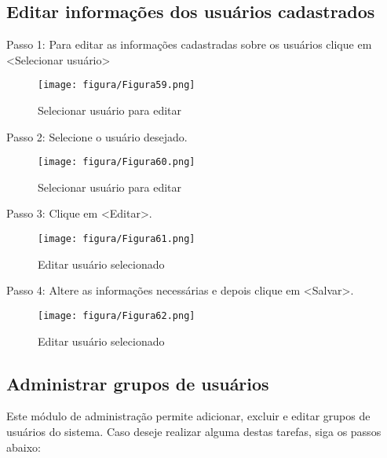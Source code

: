 \documentclass[12pt,hidelinks]{article}
\begin{document}
    \subsection{Editar informações dos usuários cadastrados}
    
    Passo 1: Para editar as informações cadastradas sobre os usuários clique em <Selecionar usuário>
    
    \begin{figure}[!htp]
                \centering
                \texttt{[image: figura/Figura59.png]}
                \caption{Selecionar usuário para editar}
            \label{Rotulo}
        \end{figure}

    Passo 2: Selecione o usuário desejado.
    
    \begin{figure}[!htp]
                \centering
                \texttt{[image: figura/Figura60.png]}
                \caption{Selecionar usuário para editar}
            \label{Rotulo}
        \end{figure}

\newpage

    Passo 3: Clique em <Editar>.
    
    \begin{figure}[!htp]
                \centering
                \texttt{[image: figura/Figura61.png]}
                \caption{Editar usuário selecionado}
            \label{Rotulo}
        \end{figure}
    
    Passo 4: Altere as informações necessárias e depois clique em <Salvar>.
    
    \begin{figure}[!htp]
                \centering
                \texttt{[image: figura/Figura62.png]}
                \caption{Editar usuário selecionado}
            \label{Rotulo}
        \end{figure}

\newpage

    \subsection{Administrar grupos de usuários}
    
    Este módulo de administração permite adicionar, excluir e editar grupos de usuários do sistema. Caso deseje realizar alguma destas tarefas, siga os passos abaixo:
    
\end{document}
